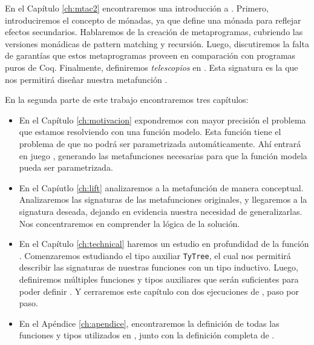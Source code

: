 En el Capítulo \ref{ch:mtac2} encontraremos una introducción a \Mtac.
Primero, introduciremos el concepto de mónadas, ya que \mtac define una mónada para reflejar efectos secundarios.
Hablaremos de la creación de metaprogramas, cubriendo las versiones monádicas de pattern matching y recursión.
Luego, discutiremos la falta de garantías que estos metaprogramas proveen en comparación con programas puros de Coq.
Finalmente, definiremos \emph{telescopios} en \Mtac. Esta signatura es la que nos permitirá diseñar nuestra metafunción \lift.

En la segunda parte de este trabajo encontraremos tres capítulos:

\begin{itemize}
 \item En el Capítulo \ref{ch:motivacion} expondremos con mayor precisión el problema que estamos resolviendo con una función modelo.
 Esta función tiene el problema de que no podrá ser parametrizada automáticamente.
 Ahí entrará en juego \lift, generando las metafunciones necesarias para que la función modela pueda ser parametrizada.
 \item En el Capíutlo \ref{ch:lift} analizaremos a la metafunción \lift de manera conceptual.
 Analizaremos las signaturas de las metafunciones originales, y llegaremos a la signatura deseada, dejando en evidencia nuestra necesidad de generalizarlas.
 Nos concentraremos en comprender la lógica de la solución.
 \item En el Capítulo \ref{ch:technical} haremos un estudio en profundidad de la función \lift.
 Comenzaremos estudiando el tipo auxiliar \lstinline{TyTree}, el cual nos permitirá describir las signaturas de nuestras funciones con un tipo inductivo.
 Luego, definiremos múltiples funciones y tipos auxiliares que serán suficientes para poder definir \lift.
 Y cerraremos este capítulo con dos ejecuciones de \lift, paso por paso.
 \item En el Apéndice \ref{ch:apendice}, encontraremos la definición de todas las funciones y tipos utilizados en \lift, junto con la definición completa de \lift.
\end{itemize}